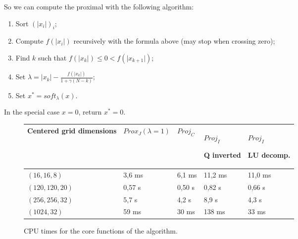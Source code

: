 \documentclass[13pt,aps,prb,preprint]{article}
\begin{document}
So we can compute the proximal with the following algorithm:
\begin{enumerate}
\item Sort $(\vert x_i \vert)_i$;
\item Compute $f(\vert x_i \vert )$ recursively with the formula above (may stop when crossing zero);
\item Find $k$ such that $f(\vert x_k \vert) \leq 0 < f(\vert x_{k+1} \vert)$;
\item Set $\lambda = \vert x_k \vert - \frac{f(\vert x_k \vert)}{1+\gamma (N-k)}$;
\item Set $x^*=soft_{\lambda}(x)$.
\end{enumerate}

In the special case $x=0$, return $x^*=0$.



\begin{figure}
\begin{tabular}{l|p{2.5cm}p{2.5cm}p{2.5cm}p{2.5cm}}
Centered grid dimensions	& $Prox_J(\lambda =1)$ 	& $Proj_C$ 	& $Proj_I$

Q inverted 	& $Proj_I$

LU decomp.\\ \hline
$(16,16,8)$		& 3,6 ms 		& 6,1 ms 		& 11,2 ms				&	11,0 ms \\
$(120,120,20)$ 	& 0,57 s		& 0,50 s		& 0,82 s				& 0,66 s \\
$(256,256,32)$ 	&   5,7 s   		&   4,2 s 		&    8,9 s  				& 4,3 s   \\
$(1024,32)$		& 59 ms		&   30 ms		& 138 ms				& 33 ms	      \\ 	\hline
\end{tabular}
\caption{CPU times for the core functions of the algorithm.}
\label{Computational times}
\end{figure}

%
%
\end{document}
